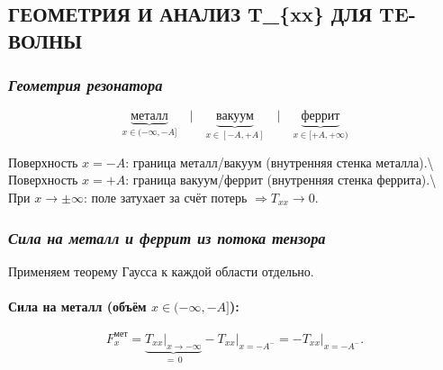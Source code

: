 \documentclass[11pt]{article}
\begin{document}
    \subsection{ГЕОМЕТРИЯ И АНАЛИЗ T\_\{xx\} ДЛЯ
TE-ВОЛНЫ}\label{ux433ux435ux43eux43cux435ux442ux440ux438ux44f-ux438-ux430ux43dux430ux43bux438ux437-t_xx-ux434ux43bux44f-te-ux432ux43eux43bux43dux44b}

\subsubsection{\texorpdfstring{\emph{Геометрия
резонатора}}{Геометрия резонатора}}\label{ux433ux435ux43eux43cux435ux442ux440ux438ux44f-ux440ux435ux437ux43eux43dux430ux442ux43eux440ux430}

\begin{equation*}
\underbrace{\text{металл}}_{x\in(-\infty,-A]}
\quad\Big|\quad
\underbrace{\text{вакуум}}_{x\in[-A,+A]}
\quad\Big|\quad
\underbrace{\text{феррит}}_{x\in[+A,+\infty)}
\end{equation*}

Поверхность \(x=-A\): граница металл/вакуум (внутренняя стенка
металла).\textbackslash{} Поверхность \(x=+A\): граница вакуум/феррит
(внутренняя стенка феррита).\textbackslash{} При \(x\to\pm\infty\): поле
затухает за счёт потерь \(\Rightarrow T_{xx}\to 0\).

    \subsubsection{\texorpdfstring{\emph{Сила на металл и феррит из потока
тензора}}{Сила на металл и феррит из потока тензора}}\label{ux441ux438ux43bux430-ux43dux430-ux43cux435ux442ux430ux43bux43b-ux438-ux444ux435ux440ux440ux438ux442-ux438ux437-ux43fux43eux442ux43eux43aux430-ux442ux435ux43dux437ux43eux440ux430}

Применяем теорему Гаусса к каждой области отдельно.

\paragraph{\texorpdfstring{Сила на металл (объём
\(x\in(-\infty,-A]\)):}{Сила на металл (объём x\textbackslash{}in(-\textbackslash{}infty,-A{]}):}}\label{ux441ux438ux43bux430-ux43dux430-ux43cux435ux442ux430ux43bux43b-ux43eux431ux44aux451ux43c-xin-infty-a}

\begin{equation*}
    F_x^{\text{мет}} = \underbrace{T_{xx}\big|_{x\to-\infty}}_{=\,0}
                     - T_{xx}\big|_{x=-A^-}
    = -T_{xx}\big|_{x=-A^-}.
\end{equation*}
\end{document}
